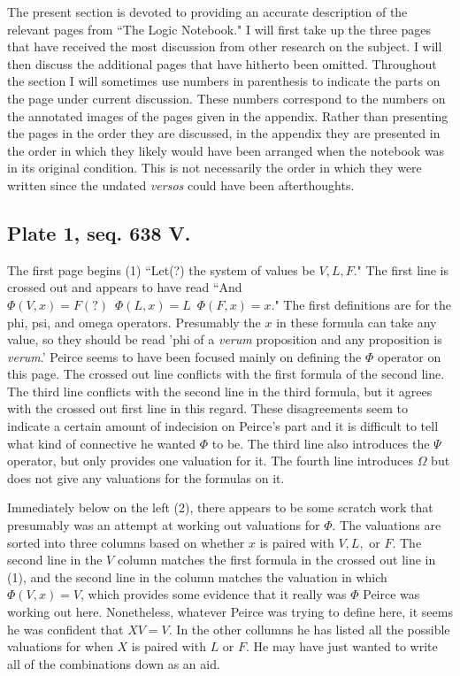 \documentclass[12pt]{article}
\begin{document}
The present section is devoted to providing an accurate description of the relevant pages from ``The Logic Notebook." I will first take up the three pages that have received the most discussion from other research on the subject. I will then discuss the additional pages that have hitherto been omitted. Throughout the section I will sometimes use numbers in parenthesis to indicate the parts on the page under current discussion. These numbers correspond to the numbers on the annotated images of the pages given in the appendix. Rather than presenting the pages in the order they are discussed, in the appendix they are presented in the order in which they likely would have been arranged when the notebook was in its original condition. This is not necessarily the order in which they were written since the undated \textit{versos} could have been afterthoughts.

\subsection{Plate 1, seq. 638 V.}

The first page begins (1) ``Let(?) the system of values be $V, L, F$." The first line is crossed out and appears to have read ``And $ \Phi(V,x)=F(?) \enspace \Phi(L,x)=L	\enspace	\Phi(F,x)=x$." The first definitions are for the phi, psi, and omega operators. Presumably the $x$ in these formula can take any value, so they should be read 'phi of a \textit{verum} proposition and any proposition is \textit{verum}.' Peirce seems to have been focused mainly on defining the $\Phi$ operator on this page. The crossed out line conflicts with the first formula of the second line. The third line conflicts with the second line in the third formula, but it agrees with the crossed out first line in this regard. These disagreements seem to indicate a certain amount of indecision on Peirce's part and it is difficult to tell what kind of connective he wanted $\Phi$ to be. The third line also introduces the $\Psi$ operator, but only provides one valuation for it. The fourth line introduces $\Omega$ but does not give any valuations for the formulas on it.

Immediately below on the left (2), there appears to be some scratch work that presumably was an attempt at working out valuations for $\Phi$. The valuations are sorted into three columns based on whether $x$ is paired with $V, L,$ or $F$. The second line in the $V$ column matches the first formula in the crossed out line in (1), and the second line in the column matches the valuation in which $\Phi(V,x)=V$, which provides some evidence that it really was $\Phi$ Peirce was working out here. Nonetheless, whatever Peirce was trying to define here, it seems he was confident that $XV=V$. In the other collumns he has listed all the possible valuations for when $X$ is paired with $L$ or $F$. He may have just wanted to write all of the combinations down as an aid.
\end{document}

